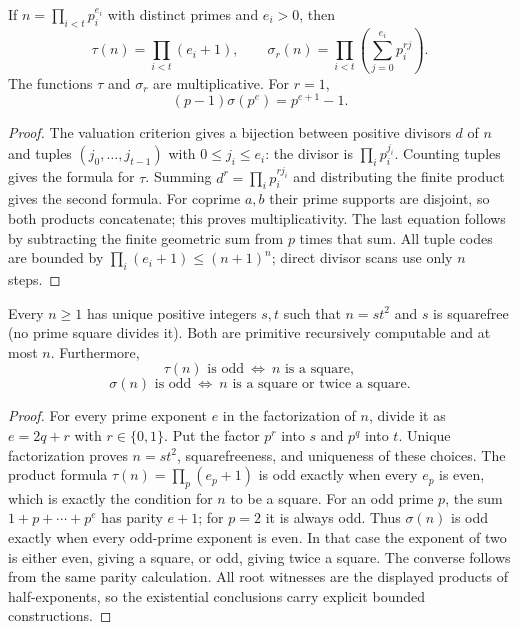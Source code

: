 \begin{theorem}
\label{el:divisorfunc}
If $n=\prod_{i<t}p_i^{e_i}$ with distinct primes and $e_i>0$, then
\[
 \tau(n)=\prod_{i<t}(e_i+1),\qquad
 \sigma_r(n)=\prod_{i<t}\left(\sum_{j=0}^{e_i}p_i^{rj}\right).
\]
The functions $\tau$ and $\sigma_r$ are multiplicative.  For $r=1$,
\[
             (p-1)\sigma(p^e)=p^{e+1}-1.
\]
\end{theorem}
\begin{proof}
The valuation criterion gives a bijection between positive divisors
$d$ of $n$ and tuples $(j_0,\ldots,j_{t-1})$ with $0\le j_i\le e_i$:
the divisor is $\prod_i p_i^{j_i}$.  Counting tuples gives the formula
for $\tau$.  Summing $d^r=\prod_i p_i^{rj_i}$ and distributing the
finite product gives the second formula.  For coprime $a,b$ their
prime supports are disjoint, so both products concatenate; this proves
multiplicativity.  The last equation follows by subtracting the finite
geometric sum from $p$ times that sum.  All tuple codes are bounded by
$\prod_i(e_i+1)\le(n+1)^n$; direct divisor scans use only $n$ steps.
\end{proof}

\begin{theorem}
\label{el:squareparity}
Every $n\ge1$ has unique positive integers $s,t$ such that
$n=st^2$ and $s$ is squarefree (no prime square divides it).
Both are primitive recursively computable and at most $n$.
Furthermore,
\[
 \tau(n)\text{ is odd}\ \Longleftrightarrow\ n\text{ is a square},
\]
\[
 \sigma(n)\text{ is odd}\ \Longleftrightarrow\
 n\text{ is a square or twice a square}.
\]
\end{theorem}
\begin{proof}
For every prime exponent $e$ in the factorization of $n$, divide it
as $e=2q+r$ with $r\in\{0,1\}$.  Put the factor $p^r$ into $s$ and
$p^q$ into $t$.  Unique factorization proves $n=st^2$, squarefreeness,
and uniqueness of these choices.  The product formula
$\tau(n)=\prod_p(e_p+1)$ is odd exactly when every $e_p$ is even,
which is exactly the condition for $n$ to be a square.
For an odd prime $p$, the sum $1+p+\cdots+p^e$ has parity $e+1$;
for $p=2$ it is always odd.  Thus $\sigma(n)$ is odd exactly when
every odd-prime exponent is even.  In that case the exponent of
two is either even, giving a square, or odd, giving twice a square.
The converse follows from the same parity calculation.
All root witnesses are the displayed products of half-exponents,
so the existential conclusions carry explicit bounded constructions.
\end{proof}

